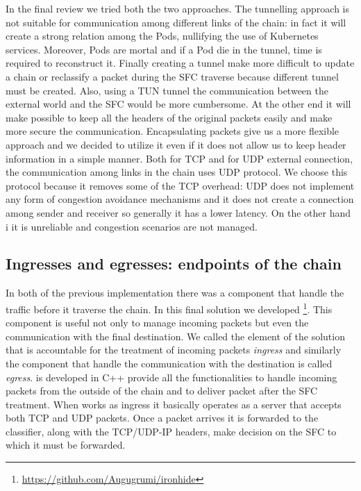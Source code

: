 \vspace*{1cm}

\noindent In the final review we tried both the two approaches. The tunnelling
approach is not suitable for communication among different links of the chain:
in fact it will create a strong relation among the Pods, nullifying the use of
Kubernetes services. Moreover, Pods are mortal and if a Pod die in the tunnel,
time is required to reconstruct it. Finally creating a tunnel make more
difficult to update a chain or reclassify a packet during the SFC traverse
because different tunnel must be created. Also, using a TUN tunnel the
communication between the external world and the SFC would be more cumbersome.
At the other end it will make possible to keep all the headers of the original
packets easily and make more secure the communication. Encapsulating packets
give us a more flexible approach and we decided to utilize it even if it does
not allow us to keep header information in a simple manner. Both for TCP and for
UDP external connection, the communication among links in the chain uses UDP
protocol. We choose this protocol because it removes some of the TCP overhead:
UDP does not implement any form of congestion avoidance mechanisms and it does
not create a connection among sender and receiver so generally it has a lower
latency. On the other hand i it is unreliable and congestion scenarios are not
managed.

\subsection{Ingresses and egresses: endpoints of the chain}
\label{chap:impl:subsec:endpoints}
In both of the previous implementation there was a component that handle the
traffic before it traverse the chain. In this final solution we developed 
\ironhide{}\footnote{\url{https://github.com/Augugrumi/ironhide}}. This
component is useful not only to manage incoming packets but even the
communication with the final destination. We called the element of the solution
that is accountable for the treatment of incoming packets \emph{ingress} and
similarly the component that handle the communication with the destination is
called \emph{egress}. \ironhide{} is developed in C++ provide all the
functionalities to handle incoming packets from the outside of the chain and to
deliver packet after the SFC treatment. When \ironhide{} works as ingress it
basically operates as a server that accepts both TCP and UDP packets. Once a
packet arrives it is forwarded to the classifier, along with the TCP/UDP-IP
headers, make decision on the SFC to which it must be forwarded.


